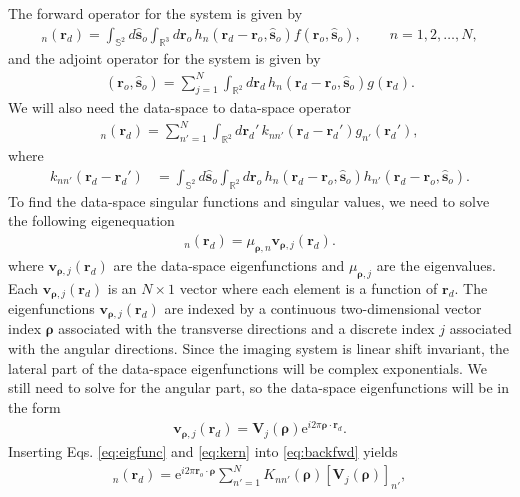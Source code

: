 \documentclass[11pt]{article}
\newcommand{\me}{\mathrm{e}}
\providecommand{\mb}[1]{\mathbf{#1}}
\providecommand{\ro}[1]{\mathbf{\mathbf{r}}_o}
\providecommand{\so}[1]{\mathbf{\hat{s}}_o}
\providecommand{\rd}[1]{\mathbf{r}_d}
\providecommand{\mbb}[1]{\mathbb{#1}}
\providecommand{\bs}[1]{\boldsymbol{#1}}
\begin{document}
The forward operator for the system is given by
\begin{align}
    [\mathcal{H}f]_n(\rd{}) = \int_{\mbb{S}^2}d\so{}\int_{\mbb{R}^3}d\ro{}\, h_n(\rd{} - \ro{}, \so{})f(\ro{}, \so{}),\qquad  n=1, 2,\ldots,N, \label{eq:fwd}
\end{align}
and the adjoint operator for the system is given by
\begin{align}
    [\mathcal{H}^{\dagger}\mb{g}](\ro{}, \so{}) = \sum_{j=1}^N\int_{\mbb{R}^2}d\mb{r}_{d}\, h_n(\rd{} - \ro{}, \so{})g(\rd{}).\label{eq:adj}
\end{align}
We will also need the data-space to data-space operator
\begin{align}
  [\mathcal{H}\mathcal{H}^{\dagger}\mb{g}]_n(\rd{}) = \sum_{n'=1}^N\int_{\mbb{R}^2}d\rd{}'\, k_{nn'}(\rd{} - \rd{}')g_{n'}(\rd{}'), \label{eq:backfwd}
\end{align}
where 
\begin{align}
  k_{nn'}(\rd{} - \rd{}') &= \int_{\mbb{S}^2}d\so{}\int_{\mbb{R}^2}d\ro{}\, h_n(\rd{} - \ro{}, \so{})h_{n'}(\rd{} - \ro{}, \so{}). \label{eq:kern}
\end{align}
To find the data-space singular functions and singular values, we need to
solve the following eigenequation
\begin{align}
  [\mathcal{H}\mathcal{H}^{\dagger}\mb{v}_{\bs{\rho}, j}]_n(\rd{}) = \mu_{\bs{\rho}, n} \mb{v}_{\bs{\rho}, j}(\rd{}). \label{eq:eigval}
\end{align}
where $\mb{v}_{\bs{\rho}, j}(\rd{})$ are the data-space eigenfunctions and
$\mu_{\bs{\rho}, j}$ are the eigenvalues. Each $\mb{v}_{\bs{\rho}, j}(\rd{})$ is
an $N\times 1$ vector where each element is a function of $\rd{}$. The eigenfunctions $\mb{v}_{\bs{\rho}, j}(\rd{})$ are indexed by a
continuous two-dimensional vector index $\bs{\rho}$ associated with the
transverse directions and a discrete index $j$ associated with the angular
directions. Since the imaging system is linear shift invariant, the lateral part
of the data-space eigenfunctions will be complex exponentials. We still need to
solve for the angular part, so the data-space eigenfunctions will be in the form
\begin{align}
  \mb{v}_{\bs{\rho},j}(\rd{}) = \mb{V}_j(\bs{\rho})\me{}^{i 2\pi \bs{\rho}\cdot\rd{}}. \label{eq:eigfunc}
\end{align}
Inserting Eqs. \ref{eq:eigfunc} and \ref{eq:kern} into \ref{eq:backfwd} yields
\begin{align}
  [\mathcal{H}\mathcal{H}^{\dagger}\mb{v}_{\bs{\rho},j}]_n(\rd{}) = \me{}^{i 2\pi \ro{}\cdot\bs{\rho}} \sum_{n'=1}^N K_{nn'}(\bs{\rho})[\mb{V}_j(\bs{\rho})]_{n'}, \label{eq:exp}
\end{align}
\end{document}
